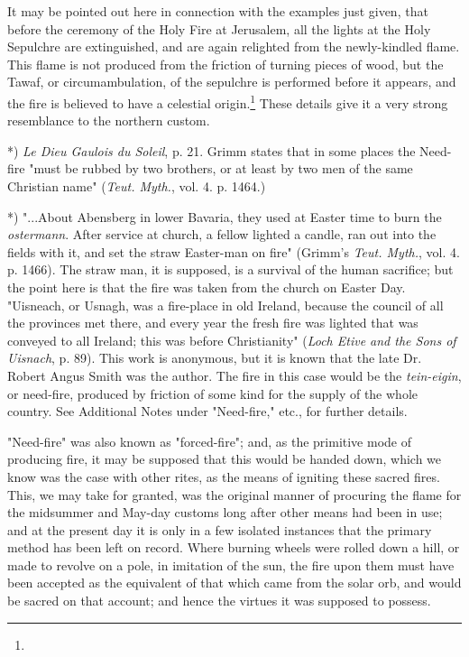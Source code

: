 \documentclass[a4paper, 11pt, oneside, polutonikogreek, english]{article}
\begin{document}
It may be pointed out here in connection with the examples just given, that before the ceremony of the Holy Fire at Jerusalem, all the lights at the Holy Sepulchre are extinguished, and are again relighted from the newly-kindled flame. This flame is not produced from the friction of turning pieces of wood, but the Tawaf, or circumambulation, of the sepulchre is performed before it appears, and the fire is believed to have a celestial origin.\footnote{} These details give it a very strong resemblance to the northern custom.

*) \emph{Le Dieu Gaulois du Soleil}, p. 21. Grimm states that in some places the Need-fire "must be rubbed by two brothers, or at least by two men of the same Christian name" (\emph{Teut. Myth.}, vol. 4. p. 1464.)

*) "...About Abensberg in lower Bavaria, they used at Easter time to burn the \emph{ostermann}. After service at church, a fellow lighted a candle, ran out into the fields with it, and set the straw Easter-man on fire" (Grimm's \emph{Teut. Myth.}, vol. 4. p. 1466). The straw man, it is supposed, is a survival of the human sacrifice; but the point here is that the fire was taken from the church on Easter Day. "Uisneach, or Usnagh, was a fire-place in old Ireland, because the council of all the provinces met there, and every year the fresh fire was lighted that was conveyed to all Ireland; this was before Christianity" (\emph{Loch Etive and the Sons of Uisnach}, p. 89). This work is anonymous, but it is known that the late Dr. Robert Angus Smith was the author. The fire in this case would be the \emph{tein-eigin}, or need-fire, produced by friction of some kind for the supply of the whole country. See Additional Notes under "Need-fire," etc., for further details.

"Need-fire" was also known as "forced-fire"; and, as the primitive mode of producing fire, it may be supposed that this would be handed down, which we know was the case with other rites, as the means of igniting these sacred fires. This, we may take for granted, was the original manner of procuring the flame for the midsummer and May-day customs long after other means had been in use; and at the present day it is only in a few isolated instances that the primary method has been left on record. Where burning wheels were rolled down a hill, or made to revolve on a pole, in imitation of the sun, the fire upon them must have been accepted as the equivalent of that which came from the solar orb, and would be sacred on that account; and hence the virtues it was supposed to possess.
\end{document}
